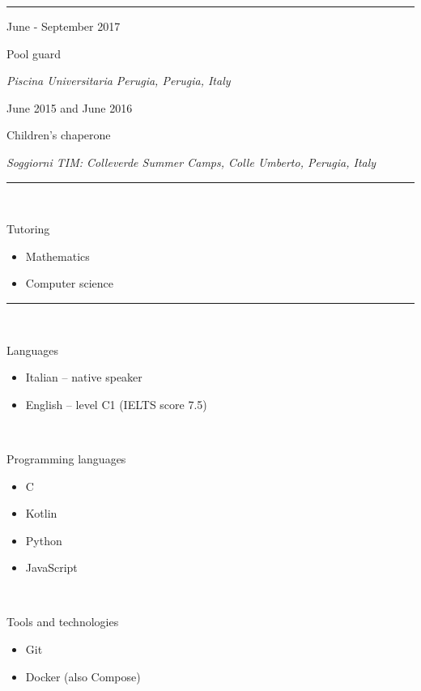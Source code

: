 \documentclass[a4paper,10pt]{article}
\newlength{\cvcolumngapwidth}
\newlength{\cvleftcolumnwidth}
\newlength{\cvrightcolumnwidth}
\newcommand{\cvsectionstyle}[1]{{\normalsize\cvsectionfont\textcolor{cvsectioncolor}{#1}}}
\newcommand{\cvtitlestyle}[1]{{\large\cvtitlefont\textcolor{cvtitlecolor}{#1}}}
\newcommand{\cvdurationstyle}[1]{{\small\cvdurationfont\textcolor{cvdurationcolor}{#1}}}
\newcommand{\cvheadingstyle}[1]{{\normalsize\cvheadingfont\textcolor{cvheadingcolor}{#1}}}
\newlength{\cvafteritemskipamount}
\newlength{\cvaftersectionskipamount}
\newlength{\cvbetweensectionandheadingextraskipamount}
\newlength{\cvaftertitleskipamount}
\newlength{\cvparskip}
\newcommand{\cvsection}[1]{
    \begin{minipage}[t]{\cvleftcolumnwidth}
        \raggedleft\cvsectionstyle{#1}
    \end{minipage}%
    \hspace{\cvcolumngapwidth}%
    \begin{minipage}[t]{\cvrightcolumnwidth}
        \textcolor{cvrulecolor}{\rule{\cvrightcolumnwidth}{0.3mm}}
    \end{minipage}

    \vspace{\cvaftersectionskipamount}
}
\newcommand{\cvitem}[2]{
    \begin{minipage}[t]{\cvleftcolumnwidth}
        \raggedleft #1
    \end{minipage}%
    \hspace{\cvcolumngapwidth}%
    \begin{minipage}[t]{\cvrightcolumnwidth}
        \setlength{\parskip}{\cvparskip} #2
    \end{minipage}

    \vspace{\cvafteritemskipamount}
}
\newcommand{\cvtitle}[1]{
    \cvtitlestyle{#1}

    \vspace{\cvaftertitleskipamount}
    \vspace{-\cvparskip}
}
\begin{document}

\cvsection{WORK EXPERIENCE}

\cvitem{
    \cvdurationstyle{June - September 2017}
}{
    \cvtitle{Pool guard}
    
    \textit{Piscina Universitaria Perugia, Perugia, Italy}
}

\cvitem{
    \cvdurationstyle{June 2015 and June 2016}
}{
    \cvtitle{Children's chaperone}

    \textit{Soggiorni TIM: Colleverde Summer Camps, Colle Umberto, Perugia, Italy}
}



\cvsection{OTHER EXPERIENCES}

\cvitem{
    \ 
}{
    \cvheadingstyle{Tutoring}
    \begin{itemize}[leftmargin=*]
        \item Mathematics
        \item Computer science
    \end{itemize}
}


\cvsection{SKILLS}

\vspace{\cvbetweensectionandheadingextraskipamount}

\cvitem{
    \ 
}{
    \cvheadingstyle{Languages}
    \begin{itemize}[leftmargin=*]
        \item Italian -- native speaker
        \item English -- level C1 (IELTS score 7.5)
    \end{itemize}
    
}

\cvitem{
    \ 
}{
    \cvheadingstyle{Programming languages}
    \begin{itemize}[leftmargin=*]
        \item C
        \item Kotlin
        \item Python
        \item JavaScript 
    \end{itemize}

}

\cvitem{
    \ 
}{
    \cvheadingstyle{Tools and technologies}
    \begin{itemize}[leftmargin=*]
        \item Git
        \item Docker (also Compose)
    \end{itemize}    
}
\end{document}
